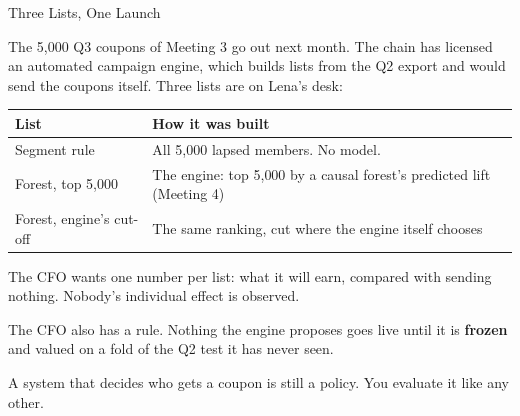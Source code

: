 \documentclass[aspectratio=169, 11pt, handout]{beamer}
\begin{document}
\begin{frame}{Three Lists, One Launch}

The 5{,}000 Q3 coupons of Meeting 3 go out next month. The chain has licensed an automated campaign engine, which builds lists from the Q2 export and would send the coupons itself. Three lists are on Lena's desk:

\begin{center}
\small
\begin{tabular}{lp{8.4cm}}
\toprule
\textbf{List} & \textbf{How it was built} \\
\midrule
Segment rule & All 5{,}000 lapsed members. No model. \\
Forest, top 5{,}000 & The engine: top 5{,}000 by a causal forest's predicted lift (Meeting 4) \\
Forest, engine's cut-off & The same ranking, cut where the engine itself chooses \\
\bottomrule
\end{tabular}
\end{center}

\medskip

The CFO wants one number per list: what it will earn, compared with sending nothing. Nobody's individual effect is observed.

\medskip

The CFO also has a rule. Nothing the engine proposes goes live until it is \textbf{frozen} and valued on a fold of the Q2 test it has never seen.

\medskip

\small A system that decides who gets a coupon is still a policy. You evaluate it like any other.
\end{frame}
\end{document}
